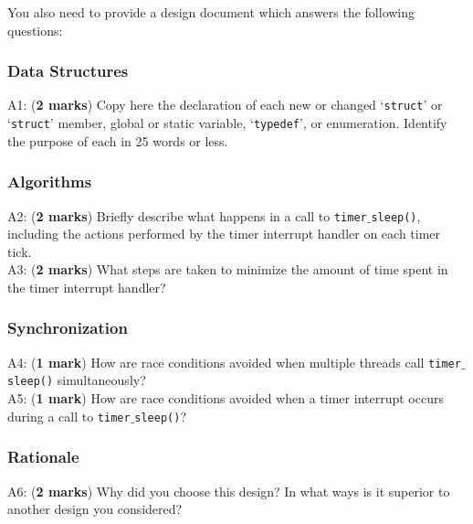 \documentclass[a4paper,12pt]{article}
\begin{document}
You also need to provide a design document which answers the following questions: 

\subsubsection*{Data Structures}
A1: ({\bf 2 marks}) Copy here the declaration of each new or changed `\texttt{struct}' or `\texttt{struct}' member, global or static variable, `\texttt{typedef}', or enumeration. Identify the purpose of each in 25 words or less.

\subsubsection*{Algorithms}
A2: ({\bf 2 marks}) Briefly describe what happens in a call to \texttt{timer$\_$sleep()}, including the actions performed by the timer interrupt handler on each timer tick. \\ 
A3: ({\bf 2 marks}) What steps are taken to minimize the amount of time spent in the timer interrupt handler?

\subsubsection*{Synchronization}
A4: ({\bf 1 mark}) How are race conditions avoided when multiple threads call \texttt{timer$\_$sleep()} simultaneously? \\ 
A5: ({\bf 1 mark}) How are race conditions avoided when a timer interrupt occurs during a call to \texttt{timer$\_$sleep()}?

\subsubsection*{Rationale}
A6: ({\bf 2 marks}) Why did you choose this design?  
In what ways is it superior to another design you considered?
\end{document}
